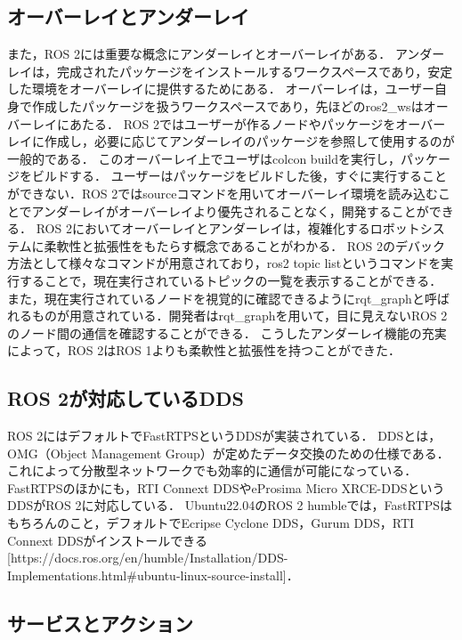 \subsection{オーバーレイとアンダーレイ}
また，ROS 2には重要な概念にアンダーレイとオーバーレイがある．
アンダーレイは，完成されたパッケージをインストールするワークスペースであり，安定した環境をオーバーレイに提供するためにある．
オーバーレイは，ユーザー自身で作成したパッケージを扱うワークスペースであり，先ほどのros2_wsはオーバーレイにあたる．
ROS 2ではユーザーが作るノードやパッケージをオーバーレイに作成し，必要に応じてアンダーレイのパッケージを参照して使用するのが一般的である．
このオーバーレイ上でユーザはcolcon buildを実行し，パッケージをビルドする．
ユーザーはパッケージをビルドした後，すぐに実行することができない．ROS 2ではsourceコマンドを用いてオーバーレイ環境を読み込むことでアンダーレイがオーバーレイより優先されることなく，開発することができる．
ROS 2においてオーバーレイとアンダーレイは，複雑化するロボットシステムに柔軟性と拡張性をもたらす概念であることがわかる．
ROS 2のデバック方法として様々なコマンドが用意されており，ros2 topic listというコマンドを実行することで，現在実行されているトピックの一覧を表示することができる．
また，現在実行されているノードを視覚的に確認できるようにrqt_graphと呼ばれるものが用意されている．開発者はrqt_graphを用いて，目に見えないROS 2のノード間の通信を確認することができる．
こうしたアンダーレイ機能の充実によって，ROS 2はROS 1よりも柔軟性と拡張性を持つことができた．
\subsection{ROS 2が対応しているDDS}
ROS 2にはデフォルトでFastRTPSというDDSが実装されている．
DDSとは，OMG（Object Management Group）が定めたデータ交換のための仕様である．これによって分散型ネットワークでも効率的に通信が可能になっている．
FastRTPSのほかにも，RTI Connext DDSやeProsima Micro XRCE-DDSというDDSがROS 2に対応している．
Ubuntu22.04のROS 2 humbleでは，FastRTPSはもちろんのこと，デフォルトでEcripse Cyclone DDS，Gurum DDS，RTI Connext DDSがインストールできる[https://docs.ros.org/en/humble/Installation/DDS-Implementations.html#ubuntu-linux-source-install]．
\subsection{サービスとアクション}

